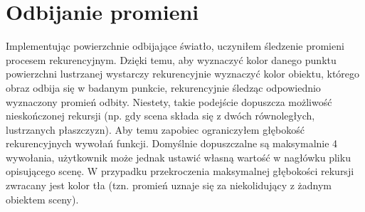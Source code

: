 \documentclass[11pt,a4paper]{article}
\begin{document}
\section{Odbijanie promieni}
Implementując powierzchnie odbijające światło, uczyniłem śledzenie promieni procesem rekurencyjnym. Dzięki temu, aby wyznaczyć kolor danego punktu powierzchni lustrzanej wystarczy rekurencyjnie wyznaczyć kolor obiektu, którego obraz odbija się w badanym punkcie, rekurencyjnie śledząc odpowiednio wyznaczony promień odbity. Niestety, takie podejście dopuszcza możliwość nieskończonej rekursji (np. gdy scena składa się z dwóch równoległych, lustrzanych płaszczyzn). Aby temu zapobiec ograniczyłem głębokość rekurencyjnych wywołań funkcji. Domyślnie dopuszczalne są maksymalnie 4 wywołania, użytkownik może jednak ustawić własną wartość w nagłówku pliku opisującego scenę. W przypadku przekroczenia maksymalnej głębokości rekursji zwracany jest kolor tła (tzn. promień uznaje się za niekolidujący z żadnym obiektem sceny).
\end{document}
